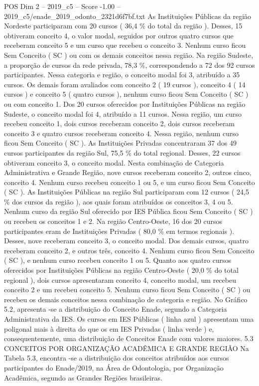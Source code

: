 \begin{textsample}{POS Dim 2 – 2019\_c5 – Score -1.00 – 2019\_c5/enade\_2019\_odonto\_2321d6f7bf.txt}
As Instituições Públicas da região Nordeste participaram com 20 cursos ( 36,4 \% do total da região ).
Desses, 15 obtiveram conceito 4, o valor modal, seguidos por outros quatro cursos que receberam conceito 5 e um curso que recebeu o conceito 3.
Nenhum curso ficou Sem Conceito ( SC ) ou com os demais conceitos nessa região.
Na região Sudeste, a proporção de cursos da rede privada, 78,3 \%, correspondendo a 72 dos 92 cursos participantes.
Nessa categoria e região, o conceito modal foi 3, atribuído a 35 cursos.
Os demais foram avaliados com conceito 2 ( 19 cursos ), conceito 4 ( 14 cursos ) e conceito 5 ( quatro cursos ), nenhum curso ficou Sem Conceito ( SC ) ou com conceito 1.
Dos 20 cursos oferecidos por Instituições Públicas na região Sudeste, o conceito modal foi 4, atribuído a 11 cursos.
Nessa região, um curso recebeu conceito 1, dois cursos receberam conceito 2, dois cursos receberam conceito 3 e quatro cursos receberam conceito 4.
Nessa região, nenhum curso ficou Sem Conceito ( SC ).
As Instituições Privadas concentraram 37 dos 49 cursos participantes da região Sul, 75,5 \% do total regional.
Desses, 22 cursos obtiveram conceito 3, o conceito modal.
Nesta combinação de Categoria Administrativa e Grande Região, nove cursos receberam conceito 2, outros cinco, conceito 4.
Nenhum curso recebeu conceito 1 ou 5, e um curso ficou Sem Conceito ( SC ).
As Instituições Públicas na região Sul participaram com 12 cursos ( 24,5 \% dos cursos da região ), aos quais foram atribuídos os conceitos 3, 4 ou 5.
Nenhum curso da região Sul oferecido por IES Pública ficou Sem Conceito ( SC ) ou recebeu os conceitos 1 e 2.
Na região Centro-Oeste, 16 dos 20 cursos participantes eram de Instituições Privadas ( 80,0 \% em termos regionais ).
Desses, nove receberam conceito 3, o conceito modal.
Dos demais cursos, quatro receberam conceito 2, e outros três, conceito 4.
Nenhum curso ficou Sem Conceito ( SC ), e nenhum curso recebeu conceito 1 ou 5.
Quanto aos quatro cursos oferecidos por Instituições Públicas na região Centro-Oeste ( 20,0 \% do total regional ), dois cursos apresentaram conceito 4, conceito modal, um recebeu conceito 2 e um recebeu conceito 5.
Nenhum curso ficou Sem Conceito ( SC ) ou recebeu os demais conceitos nessa combinação de categoria e região.
No Gráfico 5.2, apresenta -se a distribuição do Conceito Enade, segundo a Categoria Administrativa da IES.
Os cursos em IES Públicas ( linha azul ) apresentam uma poligonal mais à direita do que os em IES Privadas ( linha verde ) e, consequentemente, uma distribuição de Conceitos Enade com valores maiores. 5.3 CONCEITOS POR ORGANIZAÇÃO ACADÊMICA E GRANDE REGIÃO Na Tabela 5.3, encontra -se a distribuição dos conceitos atribuídos aos cursos participantes do Enade/2019, na Área de Odontologia, por Organização Acadêmica, segundo as Grandes Regiões brasileiras.

\end{textsample}
